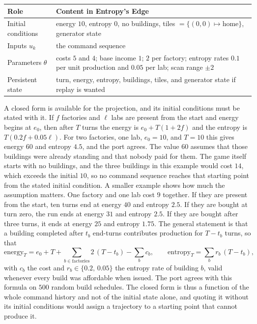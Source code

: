 \begin{center}
\begin{tabular}{@{}lp{}@{}}
\toprule
Role & Content in Entropy's Edge\\
\midrule
Initial conditions & energy $10$, entropy $0$, no buildings, tiles $=\{(0,0)\mapsto\text{home}\}$, generator state\\
Inputs $u_k$ & the command sequence\\
Parameters $\theta$ & costs $5$ and $4$; base income $1$; $2$ per factory; entropy rates $0.1$ per unit production and $0.05$ per lab; scan range $\pm2$\\
Persistent state & turn, energy, entropy, buildings, tiles, and generator state if replay is wanted\\
\bottomrule
\end{tabular}
\end{center}

A closed form is available for the projection, and its initial conditions must be stated with it. If $f$ factories and $\ell$ labs are present from the start and energy begins at $e_0$, then after $T$ turns the energy is $e_0+T(1+2f)$ and the entropy is $T(0.2f+0.05\ell)$. For two factories, one lab, $e_0=10$, and $T=10$ this gives energy $60$ and entropy $4.5$, and the port agrees. The value $60$ assumes that those buildings were already standing and that nobody paid for them. The game itself starts with no buildings, and the three buildings in this example would cost $14$, which exceeds the initial $10$, so no command sequence reaches that starting point from the stated initial condition. A smaller example shows how much the assumption matters. One factory and one lab cost $9$ together. If they are present from the start, ten turns end at energy $40$ and entropy $2.5$. If they are bought at turn zero, the run ends at energy $31$ and entropy $2.5$. If they are bought after three turns, it ends at energy $25$ and entropy $1.75$. The general statement is that a building completed after $t_b$ end-turns contributes production for $T-t_b$ turns, so that
\[
  \text{energy}_T=e_0+T+\sum_{b\in\text{factories}}2\,(T-t_b)-\sum_b c_b,\qquad
  \text{entropy}_T=\sum_b r_b\,(T-t_b),
\]
with $c_b$ the cost and $r_b\in\{0.2,\,0.05\}$ the entropy rate of building $b$, valid whenever every build was affordable when issued. The port agrees with this formula on $500$ random build schedules. The closed form is thus a function of the whole command history and not of the initial state alone, and quoting it without its initial conditions would assign a trajectory to a starting point that cannot produce it.

